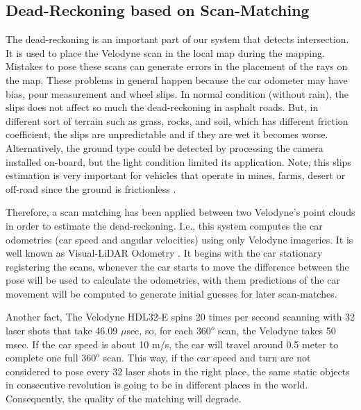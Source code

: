 \subsection{Dead-Reckoning based on Scan-Matching}

The dead-reckoning is an important part of our system that detects intersection. It is used to place the Velodyne scan in the local map during the mapping. Mistakes to pose these scans can generate errors in the placement of the rays on the map. These problems in general happen because the car odometer may have bias, pour measurement and wheel slips. 
In normal condition (without rain), the slips does not affect so much the dead-reckoning in asphalt roads. But, in different sort of terrain such as grass, rocks, and soil, which has different friction coefficient, the slips are unpredictable and if they are wet it becomes worse. Alternatively, the ground type could be detected by processing the camera installed on-board, but the light condition limited its application. Note, this slips estimation is very important for vehicles that operate in mines, farms, desert or off-road since the ground is frictionless \cite{woodsterrain}.

Therefore, a scan matching has been applied between two Velodyne's point clouds in order to estimate the dead-reckoning. I.e., this system computes the car odometries (car speed and angular velocities) using only Velodyne imageries. It is well known as Visual-LiDAR Odometry \cite{Zhang_LOAM, Zhang_V-LOAM, zhang2014real}. It begins with the car stationary registering the scans, whenever the car starts to move the difference between the pose will be used to calculate the odometries, with them predictions of the car movement will be computed to generate initial guesses for later scan-matches.

Another fact, The Velodyne HDL32-E spins 20 times per second scanning with 32 laser shots that take 46.09 $\mu$sec, so, for each $360^{o}$ scan, the Velodyne takes 50 msec. If the car speed is about 10 m/s, the car will travel around 0.5 meter to complete one full $360^{o}$ scan. This way, if the car speed and turn are not considered to pose every 32 laser shots in the right place, the same static objects in consecutive revolution is going to be in different places in the world. Consequently, the quality of the matching will degrade.


